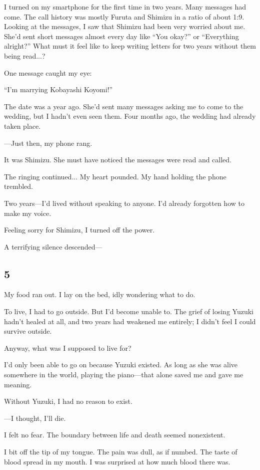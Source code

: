 \documentclass[
    a4paper,
    12pt,
    twoside,
    openany,
    UTF8,
    fontset=windows
]{ctexbook}
\begin{document}
I turned on my smartphone for the first time in two years. Many messages had come. The call history was mostly Furuta and Shimizu in a ratio of about 1:9. Looking at the messages, I saw that Shimizu had been very worried about me. She'd sent short messages almost every day like ``You okay?'' or ``Everything alright?'' What must it feel like to keep writing letters for two years without them being read...?

One message caught my eye:

``I'm marrying Kobayashi Koyomi!''

The date was a year ago. She'd sent many messages asking me to come to the wedding, but I hadn't even seen them. Four months ago, the wedding had already taken place.

---Just then, my phone rang.

It was Shimizu. She must have noticed the messages were read and called.

The ringing continued... My heart pounded. My hand holding the phone trembled.

Two years---I'd lived without speaking to anyone. I'd already forgotten how to make my voice.

Feeling sorry for Shimizu, I turned off the power.

A terrifying silence descended---


\subsection*{5}

My food ran out. I lay on the bed, idly wondering what to do.

To live, I had to go outside. But I'd become unable to. The grief of losing Yuzuki hadn't healed at all, and two years had weakened me entirely; I didn't feel I could survive outside.

Anyway, what was I supposed to live for?

I'd only been able to go on because Yuzuki existed. As long as she was alive somewhere in the world, playing the piano---that alone saved me and gave me meaning.

Without Yuzuki, I had no reason to exist.

---I thought, I'll die.

I felt no fear. The boundary between life and death seemed nonexistent.

I bit off the tip of my tongue. The pain was dull, as if numbed. The taste of blood spread in my mouth. I was surprised at how much blood there was.
\end{document}
